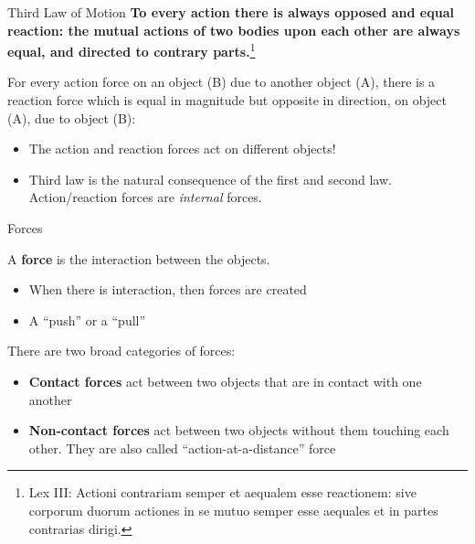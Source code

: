 \documentclass[12pt,compress,aspectratio=169]{beamer}
\newcommand{\mb}[1]{\ensuremath\mathbf{#1}}
\newcommand{\eq}[2]{\vspace{#1}{\Large\begin{displaymath}#2\end{displaymath}}}
\begin{document}
\begin{frame}{Third Law of Motion}
  \textbf{To every action there is always opposed and equal reaction: the
    mutual actions of two bodies upon each other are always equal, and directed
    to contrary parts.}\footnote{Lex III: Actioni contrariam semper et aequalem
    esse reactionem: sive corporum duorum actiones in se mutuo semper esse
    aequales et in partes contrarias dirigi.}
 
  \vspace{.1in}For every action force on an object (B) due to another object
  (A), there is a reaction force which is equal in magnitude but opposite in
  direction, on object (A), due to object (B):

  \eq{-.3in}{
    \boxed{\mb{F}_{\textrm{A on B}} = -\mb{F}_{\textrm{B on A}}}
  }
  \begin{itemize}
  \item The action and reaction forces act on different objects!
  \item Third law is the natural consequence of the first and second law.
    Action/reaction forces are \emph{internal} forces.
  \end{itemize}
  \vspace{.2in}
\end{frame}



\begin{frame}{Forces}

  A \textbf{force} is the interaction between the objects.
  \begin{itemize}
  \item When there is interaction, then forces are created
  \item A ``push'' or a ``pull''
  \end{itemize}

  There are two broad categories of forces:
  \begin{itemize}
  \item\textbf{Contact forces} act between two objects that are in contact
    with one another
  \item\textbf{Non-contact forces} act between two objects without them
    touching each other. They are also called ``action-at-a-distance'' force
  \end{itemize}
\end{frame}
\end{document}
